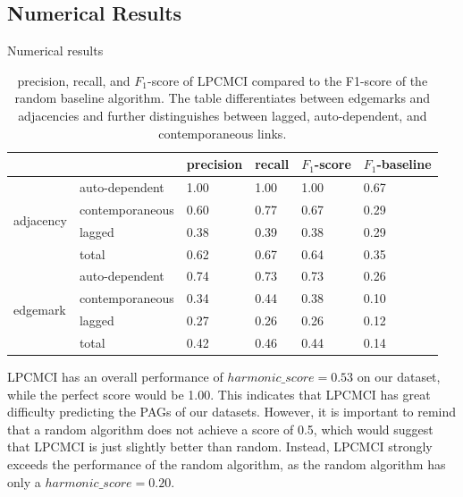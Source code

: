 \documentclass[conference]{IEEEtran}
\begin{document}
\subsection{Numerical Results}
\begin{table}[!htb]
\begin{center}
        \caption{Numerical results}
        \caption[]{precision, recall, and $F_1$-score of LPCMCI compared to the F1-score of the random baseline algorithm. The table differentiates between edgemarks and adjacencies and further distinguishes between lagged, auto-dependent, and contemporaneous links.}
      \centering
        \begin{tabular}{@{}llllll@{}}
            \toprule
            \textbf{}                  & & precision        & recall  &  $F_1$-score & $F_1$-baseline    \\ \midrule
            \multirow{4}{*}{adjacency} & auto-dependent     & 1.00             & 1.00  &  1.00     & 0.67     \\
                                       & contemporaneous    & 0.60             & 0.77  &  0.67     & 0.29     \\
                                       & lagged             & 0.38             & 0.39  &  0.38     & 0.29     \\
                                       & total              & 0.62             & 0.67  &  0.64     & 0.35     \\ \midrule
            \multirow{4}{*}{edgemark}  & auto-dependent     & 0.74             & 0.73  &  0.73     & 0.26     \\
                                       & contemporaneous    & 0.34             & 0.44  &  0.38     & 0.10     \\
                                       & lagged             & 0.27             & 0.26  &  0.26     & 0.12      \\
                                       & total              & 0.42             & 0.46  &  0.44     & 0.14     \\ 
            \end{tabular}
            \label{tab:precision_recall}
    \end{center}
\end{table}
LPCMCI has an overall performance of $harmonic\_score = 0.53$ on our dataset, while the perfect score would be 1.00. This indicates that LPCMCI has great difficulty predicting the PAGs of our datasets. However, it is important to remind that a random algorithm does not achieve a score of 0.5, which would suggest that LPCMCI is just slightly better than random. Instead, LPCMCI strongly exceeds the performance of the random algorithm, as the random algorithm has only a $harmonic\_score = 0.20$. 
\end{document}
